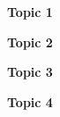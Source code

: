 \documentclass[12pt]{article}
\begin{document}
\newcommand{\topic}[1]{
  \begin{minipage}{\linewidth}
  {\bf #1}
  \vspace{4in}

  \end{minipage}
}

\topic{Topic 1}
\topic{Topic 2}
\topic{Topic 3}
\topic{Topic 4}
\end{document}
